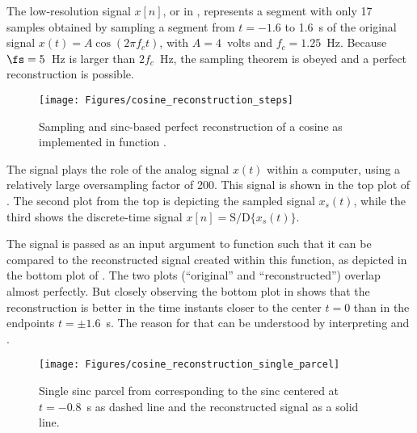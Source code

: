 
The low-resolution signal $x[n]$, or  in , represents a segment with only 17 samples obtained by sampling a segment from $t=-1.6$ to 1.6~s of the original signal $x(t)=A \cos(2 \pi f_c t)$, with $A=4$~volts and $f_c = 1.25$~Hz. Because $\fs = 5$~Hz is larger than $2 f_c$~Hz, the sampling theorem is obeyed and a perfect reconstruction is possible.

\begin{figure}
	\centering
		\texttt{[image: Figures/cosine\_reconstruction\_steps]}		
	\caption{Sampling and sinc-based perfect reconstruction of a cosine as implemented
	in function .\label{fig:cosine_reconstruction_steps}}
\end{figure}

The signal  plays the role of the analog signal $x(t)$ within a computer, using a relatively large oversampling factor of 200.
This signal is shown in the top plot of . The second plot from the top is depicting the sampled signal $x_s(t)$, while the third shows the discrete-time signal $x[n] = \textrm{S/D} \{ x_s(t) \}$.

The signal  is passed as an input argument to function
 such that it can be compared to the reconstructed signal created within this function, as depicted in the bottom plot of . The two plots (``original'' and ``reconstructed'') overlap almost  perfectly. But closely observing the bottom plot in  shows that the reconstruction is
better in the time instants closer to the center $t=0$ than in the endpoints $t = \pm 1.6$~s.
The reason for that can be understood by interpreting  and .

\begin{figure}
	\centering
		\texttt{[image: Figures/cosine\_reconstruction\_single\_parcel]}		
	\caption{Single sinc parcel from  corresponding to the sinc centered at $t=-0.8$~s as dashed line and the reconstructed signal as a solid line.\label{fig:cosine_reconstruction_single_parcel}}
\end{figure}


